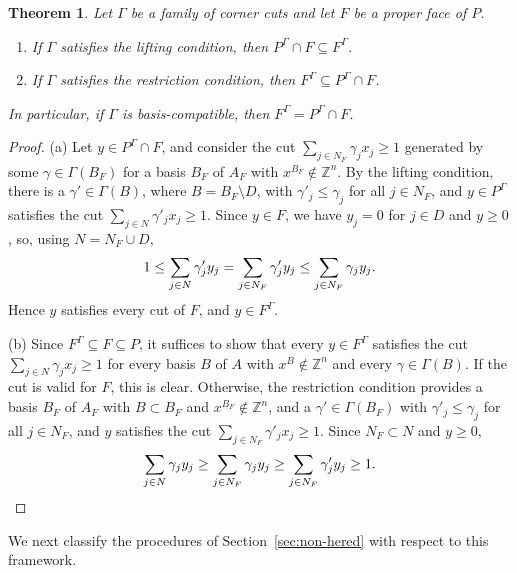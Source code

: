 \documentclass{article}
\newtheorem{theorem}{Theorem}
\newcommand{\Z}{\mathbb{Z}}
\begin{document}
\begin{theorem} \label{thm:corner-cut-hered}
    Let $\Gamma$ be a family of corner cuts and let $F$ be a proper face of $P$.
    \begin{enumerate}[label=(\alph*)]
        \item If $\Gamma$ satisfies the lifting condition, then $P^\Gamma \cap F \subseteq F^\Gamma$.
        \item If $\Gamma$ satisfies the restriction condition, then $F^\Gamma \subseteq P^\Gamma \cap F$.
    \end{enumerate}
    In particular, if $\Gamma$ is basis-compatible, then $F^\Gamma = P^\Gamma \cap F$.
\end{theorem}

\begin{proof}
    (a) Let $y \in P^\Gamma \cap F$, and consider the cut $\sum_{j \in N_F} \gamma_j x_j \geq 1$ generated by some $\gamma \in \Gamma(B_F)$ for a basis $B_F$ of $A_F$ with $x^{B_F} \notin \Z^n$. By the lifting condition, there is a $\gamma' \in \Gamma(B)$, where $B = B_F \setminus D$, with $\gamma'_j \leq \gamma_j$ for all $j \in N_F$, and $y \in P^\Gamma$ satisfies the cut $\sum_{j \in N} \gamma'_j x_j \geq 1$. Since $y \in F$, we have $y_j = 0$ for $j \in D$ and $y \geq 0$, so, using $N = N_F \cup D$,
    \begin{align}
        1 \leq \sum_{j \in N} \gamma'_j y_j = \sum_{j \in N_F} \gamma'_j y_j \leq \sum_{j \in N_F} \gamma_j y_j. \notag
    \end{align}
    Hence $y$ satisfies every cut of $F$, and $y \in F^\Gamma$.

    (b) Since $F^\Gamma \subseteq F \subseteq P$, it suffices to show that every $y \in F^\Gamma$ satisfies the cut $\sum_{j \in N} \gamma_j x_j \geq 1$ for every basis $B$ of $A$ with $x^B \notin \Z^n$ and every $\gamma \in \Gamma(B)$. If the cut is valid for $F$, this is clear. Otherwise, the restriction condition provides a basis $B_F$ of $A_F$ with $B \subset B_F$ and $x^{B_F} \notin \Z^n$, and a $\gamma' \in \Gamma(B_F)$ with $\gamma'_j \leq \gamma_j$ for all $j \in N_F$, and $y$ satisfies the cut $\sum_{j \in N_F} \gamma'_j x_j \geq 1$. Since $N_F \subset N$ and $y \geq 0$,
    \begin{align}
        \sum_{j \in N} \gamma_j y_j \geq \sum_{j \in N_F} \gamma_j y_j \geq \sum_{j \in N_F} \gamma'_j y_j \geq 1. \notag
    \end{align}
\end{proof}

We next classify the procedures of Section~\ref{sec:non-hered} with respect to this framework.
\end{document}

